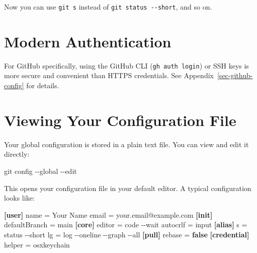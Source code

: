 \documentclass[
  letterpaper,
  DIV=11,
  numbers=noendperiod]{scrreprt}
\newenvironment{Shaded}{\begin{snugshade}}{\end{snugshade}}
\newcommand{\AttributeTok}[1]{\textcolor[rgb]{0.40,0.45,0.13}{#1}}
\newcommand{\DataTypeTok}[1]{\textcolor[rgb]{0.68,0.00,0.00}{#1}}
\newcommand{\FunctionTok}[1]{\textcolor[rgb]{0.28,0.35,0.67}{#1}}
\newcommand{\KeywordTok}[1]{\textcolor[rgb]{0.00,0.23,0.31}{\textbf{#1}}}
\newcommand{\NormalTok}[1]{\textcolor[rgb]{0.00,0.23,0.31}{#1}}
\newcommand{\OtherTok}[1]{\textcolor[rgb]{0.00,0.23,0.31}{#1}}
\newcommand{\StringTok}[1]{\textcolor[rgb]{0.13,0.47,0.30}{#1}}
\begin{document}
Now you can use \texttt{git\ s} instead of
\texttt{git\ status\ -\/-short}, and so on.

\section{Modern Authentication}\label{modern-authentication}

For GitHub specifically, using the GitHub CLI (\texttt{gh\ auth\ login})
or SSH keys is more secure and convenient than HTTPS credentials. See
Appendix~\ref{sec-github-config} for details.

\section{Viewing Your Configuration
File}\label{viewing-your-configuration-file}

Your global configuration is stored in a plain text file. You can view
and edit it directly:

\begin{codelisting}

\caption{\texttt{terminal}}

\begin{Shaded}
\begin{Highlighting}[]
\FunctionTok{git}\NormalTok{ config }\AttributeTok{{-}{-}global} \AttributeTok{{-}{-}edit}
\end{Highlighting}
\end{Shaded}

\end{codelisting}

This opens your configuration file in your default editor. A typical
configuration looks like:

\begin{codelisting}

\caption{\texttt{\textasciitilde/.gitconfig}}

\begin{Shaded}
\begin{Highlighting}[]
\KeywordTok{[user]}
\DataTypeTok{    name }\OtherTok{=}\StringTok{ Your Name}
\DataTypeTok{    email }\OtherTok{=}\StringTok{ your.email@example.com}
\KeywordTok{[init]}
\DataTypeTok{    defaultBranch }\OtherTok{=}\StringTok{ main}
\KeywordTok{[core]}
\DataTypeTok{    editor }\OtherTok{=}\StringTok{ code {-}{-}wait}
\DataTypeTok{    autocrlf }\OtherTok{=}\StringTok{ input}
\KeywordTok{[alias]}
\DataTypeTok{    s }\OtherTok{=}\StringTok{ status {-}{-}short}
\DataTypeTok{    lg }\OtherTok{=}\StringTok{ log {-}{-}oneline {-}{-}graph {-}{-}all}
\KeywordTok{[pull]}
\DataTypeTok{    rebase }\OtherTok{=}\StringTok{ }\KeywordTok{false}
\KeywordTok{[credential]}
\DataTypeTok{    helper }\OtherTok{=}\StringTok{ osxkeychain}
\end{Highlighting}
\end{Shaded}

\end{codelisting}
\end{document}
